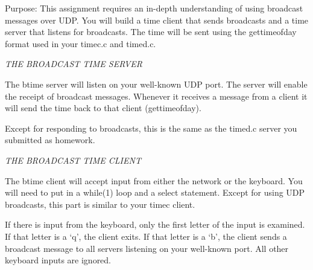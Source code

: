 

\parindent 0pt

Purpose: This assignment requires an in-depth understanding of
using broadcast messages over UDP.
You will build a time client that sends broadcasts and a time
server that listens for broadcasts.
The time will be sent using the {\ltt{}gettimeofday} format
used in your {\ltt{}timec.c} and {\ltt{}timed.c}.

{\it THE BROADCAST TIME SERVER}

The {\ltt{}btime} server will listen on your well-known UDP port.
The server will enable the receipt of broadcast messages.
Whenever it receives a message from a client it will send
the time back to that client (gettimeofday).

Except for responding to broadcasts, this is the same as
the {\ltt{}timed.c} server you submitted as homework.

{\it THE BROADCAST TIME CLIENT}

The {\ltt{}btime} client will accept input from either the
network or the keyboard.
You will need to put in a {\ltt{}while(1)} loop and
a select statement.
Except for using UDP broadcasts,
this part is similar to your {\ltt{}timec} client.

If there is input from the keyboard, only the first
letter of the input is examined.
If that letter is a `q', the client exits.
If that letter is a `b', the client sends a broadcast
message to all servers listening on your well-known port.
All other keyboard inputs are ignored.

